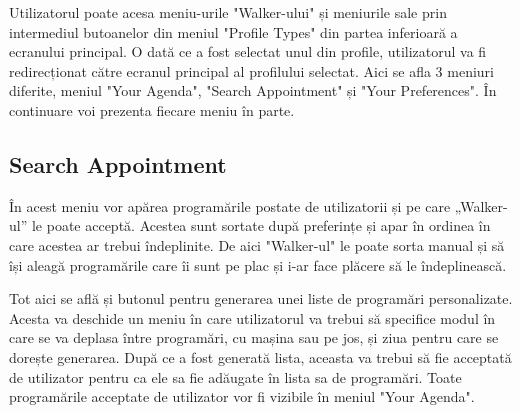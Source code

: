 Utilizatorul poate acesa meniu-urile "Walker-ului" și meniurile sale prin intermediul butoanelor din meniul "Profile Types" din partea inferioară a ecranului principal. O dată ce a fost selectat unul din profile, utilizatorul va fi redirecționat către ecranul principal al profilului selectat. Aici se afla 3 meniuri diferite, meniul "Your Agenda", "Search Appointment" și "Your Preferences". În continuare voi prezenta fiecare meniu în parte.

\newpage

\subsection{Search Appointment}

În acest meniu vor apărea programările postate de utilizatorii și pe care „Walker-ul” le poate acceptă. Acestea sunt sortate după preferințe și apar în ordinea în care acestea ar trebui îndeplinite. De aici "Walker-ul" le poate sorta manual și să își aleagă programările care îi sunt pe plac și i-ar face plăcere să le îndeplinească. 

   
Tot aici se află și butonul pentru generarea unei liste de programări personalizate. Acesta va deschide un meniu în care utilizatorul va trebui să specifice modul în care se va deplasa între programări, cu mașina sau pe jos, și ziua pentru care se dorește generarea. După ce a fost generată lista, aceasta va trebui să fie acceptată de utilizator pentru ca ele sa fie adăugate în lista sa de programări. Toate programările acceptate de utilizator vor fi vizibile în meniul "Your Agenda".


